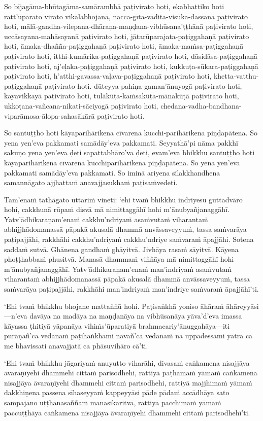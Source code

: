 So bījagāma-bhūtagāma-samārambhā paṭivirato hoti, ekabhattiko hoti ratt'ūparato virato vikālabhojanā, nacca-gīta-vādita-visūka-dassanā paṭivirato hoti, mālā­-gandha-vilepana­-dhāraṇa­-maṇḍana­-vibhūsana'ṭṭhānā paṭivirato hoti, uccāsayana-mahāsayanā paṭivirato hoti, jātarūparajata-paṭiggahaṇā paṭivirato hoti, āmaka-dhañña-paṭiggahaṇā paṭivirato hoti, āmaka-maṁsa-paṭiggahaṇā paṭivirato hoti, itthi-kumārika-paṭiggahaṇā paṭivirato hoti, dāsidāsa-paṭiggahaṇā paṭivirato hoti, aj'eḷaka-paṭiggahaṇā paṭivirato hoti, kukkuṭa-sūkara-paṭiggahaṇā paṭivirato hoti, h'atthi-gavassa-vaḷava-paṭiggahaṇā paṭivirato hoti, khetta-vatthu-paṭiggahaṇā paṭivirato hoti. dūteyya-pahiṇa-gaman'ānuyogā paṭivirato hoti, kayavikkayā paṭivirato hoti, tulākūṭa-kaṁsakūṭa-mānakūṭā paṭivirato hoti, ukkoṭana-vañcana-nikati-sāciyogā paṭivirato hoti, chedana-­vadha-bandhana­-viparāmosa-ālopa-sahasākārā paṭivirato hoti.

So santuṭṭho hoti kāyaparihārikena cīvarena kucchi-parihārikena piṇḍapātena. So yena yen'eva pakkamati samādāy'eva pakkamati. Seyyathā'pi nāma pakkhī sakuṇo yena yen'eva ḍeti sapattabhāro'va ḍeti, evam'eva bhikkhu santuṭṭho hoti kāyaparihārikena cīvarena kucchiparihārikena piṇḍapātena. So yena yen'eva pakkamati samādāy'eva pakkamati. So iminā ariyena sīlakkhandhena samannāgato ajjhattaṁ anavajjasukhaṁ paṭisaṁvedeti.

\suttaRef{[MN 51]}

Tam'enaṁ tathāgato uttariṁ vineti: `ehi tvaṁ bhikkhu indriyesu guttadvāro hohi, cakkhunā rūpaṁ disvā mā nimittaggāhī hohi m'ānubyañjanaggāhī. Yatv'ādhikaraṇam'enaṁ cakkhu'ndriyaṁ asaṁvutaṁ viharantaṁ abhijjhādomanassā pāpakā akusalā dhammā anvāssaveyyuṁ, tassa saṁvarāya paṭipajjāhi, rakkhāhi cakkhu'ndriyaṁ cakkhu'ndriye saṁvaraṁ āpajjāhi. Sotena saddaṁ sutvā. Ghānena gandhaṁ ghāyitvā. Jivhāya rasaṁ sāyitvā. Kāyena phoṭṭhabbaṁ phusitvā. Manasā dhammaṁ viññāya mā nimittaggāhī hohi m'ānubyañjanaggāhī. Yatv'ādhikaraṇam'enaṁ man'indriyaṁ asaṁvutaṁ viharantaṁ abhijjhādomanassā pāpakā akusalā dhammā anvāssaveyyuṁ, tassa saṁvarāya paṭipajjāhi, rakkhāhi man'indriyaṁ man'indriye saṁvaraṁ āpajjāhī'ti.

`Ehi tvaṁ bhikkhu bhojane mattaññū hohi. Paṭisaṅkhā yoniso āhāraṁ āhāreyyāsi—n'eva davāya na madāya na maṇḍanāya na vibhūsanāya yāva'd'eva imassa kāyassa ṭhitiyā yāpanāya vihiṁs'ūparatiyā brahmacariy'ānuggahāya—iti purāṇañ'ca vedanaṁ paṭihaṅkhāmi navañ'ca vedanaṁ na uppādessāmi yātrā ca me bhavissati anavajjatā ca phāsuvihāro cā'ti.

`Ehi tvaṁ bhikkhu jāgariyaṁ anuyutto viharāhi, divasaṁ caṅkamena nisajjāya āvaraṇīyehi dhammehi cittaṁ parisodhehi, rattiyā paṭhamaṁ yāmaṁ caṅkamena nisajjāya āvaraṇīyehi dhammehi cittaṁ parisodhehi, rattiyā majjhimaṁ yāmaṁ dakkhiṇena passena sīhaseyyaṁ kappeyyāsi pāde pādaṁ accādhāya sato sampajāno uṭṭhānasaññaṁ manasikaritvā, rattiyā pacchimaṁ yāmaṁ paccuṭṭhāya caṅkamena nisajjāya āvaraṇīyehi dhammehi cittaṁ parisodhehī'ti.

